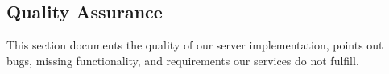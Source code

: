 \subsection{Quality Assurance}
This section documents the quality of our server implementation, points out bugs, missing functionality, and requirements our services do not fulfill. 



\newpage